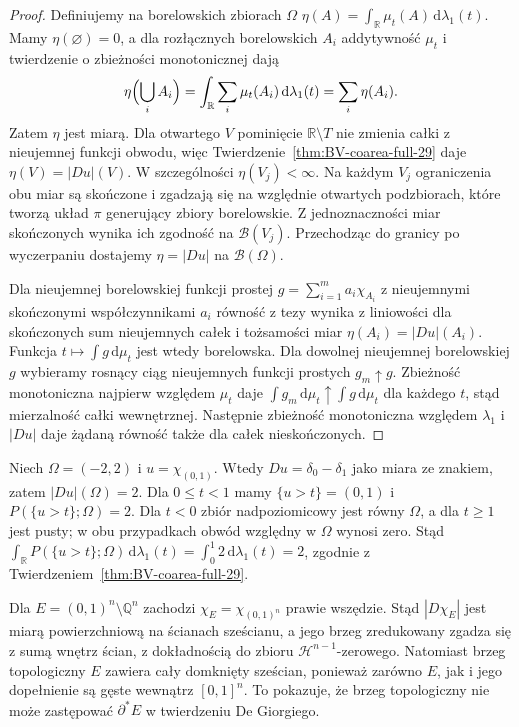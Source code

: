 \begin{proof}
Definiujemy na borelowskich zbiorach $\Omega$
$\eta(A)=\int_{\mathbb R}\mu_t(A)\,\mathrm d\lambda_1(t)$.
Mamy $\eta(\varnothing)=0$, a dla rozłącznych
borelowskich $A_i$ addytywność $\mu_t$
i twierdzenie o zbieżności monotonicznej dają
\[
 \eta\Bigl(\bigcup_iA_i\Bigr)
 =\int_{\mathbb R}\sum_i\mu_t(A_i)\,\mathrm d\lambda_1(t)
 =\sum_i\eta(A_i).
\]
Zatem $\eta$ jest miarą. Dla otwartego $V$
pominięcie $\mathbb R\setminus T$ nie zmienia
całki z nieujemnej funkcji obwodu, więc
Twierdzenie~\ref{thm:BV-coarea-full-29} daje
$\eta(V)=|Du|(V)$.
W szczególności $\eta(V_j)<\infty$.
Na każdym $V_j$ ograniczenia obu miar są
skończone i zgadzają się na względnie otwartych
podzbiorach, które tworzą układ $\pi$
generujący zbiory borelowskie. Z jednoznaczności
miar skończonych wynika ich zgodność na
$\mathcal B(V_j)$. Przechodząc do granicy
po wyczerpaniu dostajemy $\eta=|Du|$ na
$\mathcal B(\Omega)$.

Dla nieujemnej borelowskiej funkcji prostej
$g=\sum_{i=1}^m a_i\chi_{A_i}$ z nieujemnymi
skończonymi współczynnikami $a_i$ równość
z tezy wynika z liniowości dla skończonych
sum nieujemnych całek i tożsamości miar
$\eta(A_i)=|Du|(A_i)$. Funkcja
$t\mapsto\int g\,\mathrm d\mu_t$ jest wtedy
borelowska. Dla dowolnej nieujemnej borelowskiej
$g$ wybieramy rosnący ciąg nieujemnych funkcji
prostych $g_m\uparrow g$. Zbieżność monotoniczna
najpierw względem $\mu_t$ daje
$\int g_m\,\mathrm d\mu_t\uparrow\int g\,\mathrm d\mu_t$
dla każdego $t$, stąd mierzalność całki wewnętrznej.
Następnie zbieżność monotoniczna względem
$\lambda_1$ i $|Du|$ daje żądaną równość
także dla całek nieskończonych.
\end{proof}

\begin{przyklad}
Niech $\Omega=(-2,2)$ i $u=\chi_{(0,1)}$.
Wtedy $Du=\delta_0-\delta_1$ jako miara
ze znakiem, zatem $|Du|(\Omega)=2$.
Dla $0\le t<1$ mamy $\{u>t\}=(0,1)$ i
$P(\{u>t\};\Omega)=2$.
Dla $t<0$ zbiór nadpoziomicowy jest równy
$\Omega$, a dla $t\ge1$ jest pusty; w obu
przypadkach obwód względny w $\Omega$ wynosi zero. Stąd
$\int_{\mathbb R}P(\{u>t\};\Omega)
\,\mathrm d\lambda_1(t)=\int_0^1 2\,
\mathrm d\lambda_1(t)=2$, zgodnie z
Twierdzeniem~\ref{thm:BV-coarea-full-29}.
\end{przyklad}

\begin{przyklad}
Dla $E=(0,1)^n\setminus\mathbb Q^n$
zachodzi $\chi_E=\chi_{(0,1)^n}$ prawie wszędzie.
Stąd $|D\chi_E|$ jest miarą powierzchniową
na ścianach sześcianu, a jego brzeg zredukowany
zgadza się z sumą wnętrz ścian, z dokładnością
do zbioru $\mathcal H^{n-1}$-zerowego.
Natomiast brzeg topologiczny $E$ zawiera
cały domknięty sześcian, ponieważ zarówno
$E$, jak i jego dopełnienie są gęste
wewnątrz $[0,1]^n$. To pokazuje, że
brzeg topologiczny nie może zastępować
$\partial^*E$ w twierdzeniu De Giorgiego.
\end{przyklad}

